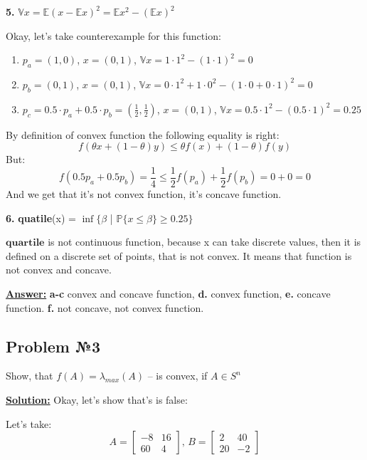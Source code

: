 \textbf{5.} $\mathds{V} x = \mathds{E} (x-\mathds{E}x)^2 = \mathds{E}x^2 - \left( \mathds{E} x\right)^2$

Okay, let's take counterexample for this function:
\begin{enumerate}
    \item  $p_a = (1, 0)$, $x = (0, 1)$, $\mathds{V}x = 1 \cdot 1^2 - (1 \cdot 1)^2 = 0$

    \item $p_b = (0, 1)$, $x = (0, 1)$, $\mathds{V}x = 0 \cdot 1^2 + 1 \cdot 0^2 - (1 \cdot 0 + 0 \cdot 1)^2 = 0$

    \item $p_c = 0.5\cdot p_a + 0.5 \cdot p_b = (\frac{1}{2}, \frac{1}{2})$, $x = (0, 1)$,
    $\mathds{V}x = 0.5 \cdot 1^2 - (0.5 \cdot 1)^2 = 0.25$
\end{enumerate}

By definition of convex function the following equality is right:
\newline
\begin{equation*}
f(\theta x + (1-\theta)y ) \leq \theta f(x) + (1-\theta) f(y)    
\end{equation*}
But:
\begin{equation*}
    f(0.5p_a + 0.5p_b)=\frac{1}{4} \leq \frac{1}{2}f(p_a) + \frac{1}{2}f(p_b) = 0 + 0 = 0
\end{equation*}
And we get that it's not convex function, it's concave function.

\textbf{6.} \textbf{quatile}(x) = $\inf \{ \beta$ | $\mathds{P} \{x \leq \beta \} \geq 0.25\}$ 

$\textbf{quartile}$ is not continuous function, because x can take discrete values, then it is defined on a discrete set of points, that is not convex. It means that function is not convex and concave.

\underline{\textbf{Answer:}}
\textbf{a-c} convex and concave function,  \textbf{d.} convex function, \textbf{e.} 
concave function. \textbf{f.} not concave, not convex function.

\subsection{Problem №3}
Show, that $f(A) = \lambda_{max}(A)$ -- is convex, if $A \in S^n$

\underline{\textbf{Solution:}}
Okay, let's show that's is false:

Let's take: 
\begin{equation*}
    A = \begin{bmatrix}
    -8 & 16 \\
    60 & 4 
\end{bmatrix} \text{, }     B = \begin{bmatrix}
    2 & 40 \\
    20 & -2
\end{bmatrix}
\end{equation*}

